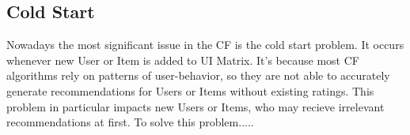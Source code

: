 \documentclass[10pt,a4paper]{article}
\begin{document}
\subsection{Cold Start}
Nowadays the most significant issue in the CF is the cold start problem. It occurs whenever new User or Item is added to UI Matrix. It's because most CF algorithms rely on patterns of user-behavior, so they are not able to accurately generate recommendations for Users or Items without existing ratings. This problem in particular impacts new Users or Items, who may recieve irrelevant recommendations at first. To solve this problem..... \cite{jannach2010recommender}




\end{document}
